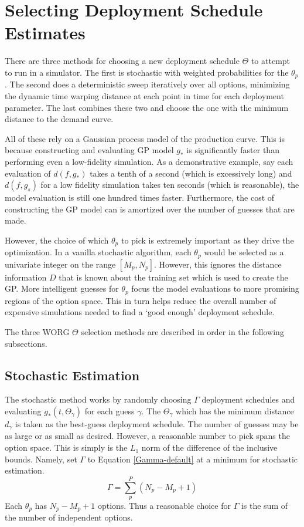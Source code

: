 \section{Selecting Deployment Schedule Estimates}
\label{selecting}

There are three methods for choosing a new deployment schedule $\Theta$ 
to attempt to run in a simulator. The first is stochastic with weighted
probabilities for the $\theta_p$.  The second does a deterministic sweep 
iteratively over all options, minimizing the dynamic time warping distance
at each point in time for each deployment parameter.  The last combines
these two and choose the one with the minimum distance to the demand curve.

All of these rely on a Gaussian process model of the production
curve. This is because constructing and evaluating GP model $g_*$ is 
significantly faster than performing even a low-fidelity simulation. 
As a demonstrative example, say each evaluation of $d(f, g_*)$ takes a tenth
of a second (which is excessively long) and $d(f, g_s)$ for a low fidelity
simulation takes ten seconds (which is reasonable), the model evaluation 
is still one hundred times faster.  Furthermore, the cost of constructing 
the GP model can is amortized over the number of guesses that are made.

However, the choice of which $\theta_p$ to pick is extremely important
as they drive the optimization. In a vanilla stochastic algorithm, 
each $\theta_p$ would be selected as a univariate integer on the 
range $[M_p, N_p]$.  However, this ignores the distance information $D$ 
that is known about the training set which is used to create the GP.
More intelligent guesses for $\theta_p$ focus the model 
evaluations to more promising regions of the option space.  This in turn 
helps reduce the overall number of expensive simulations needed to find 
a `good enough' deployment schedule.

The three WORG $\Theta$ selection methods are described in order in the 
following subsections.

\subsection{Stochastic Estimation}
\label{stochastic}

The stochastic method works by randomly choosing $\Gamma$ deployment 
schedules and evaluating $g_*(t, \Theta_\gamma)$ for each guess $\gamma$.
The $\Theta_\gamma$ which has the minimum distance $d_\gamma$ is 
taken as the best-guess deployment schedule.  The number of guesses may 
be as large or as small as desired.  However, a reasonable number to pick 
spans the option space. This is simply is the $L_1$ norm of the difference 
of the inclusive bounds. Namely, set $\Gamma$ to Equation \ref{Gamma-default}
at a minimum for stochastic estimation.
\begin{equation}
\label{Gamma-default}
\Gamma = \sum_p^P (N_p - M_p + 1)
\end{equation}
Each $\theta_p$ has $N_p - M_p + 1$ options. Thus a reasonable
choice for $\Gamma$ is the sum of the number of independent options.

